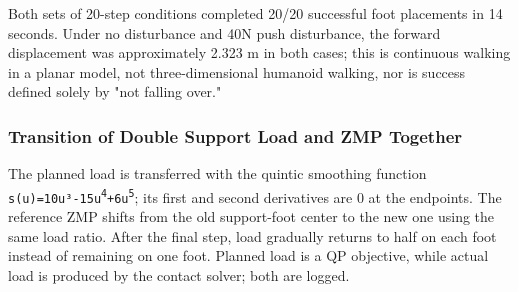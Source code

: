 Both sets of 20-step conditions completed 20/20 successful foot placements in 14 seconds. Under no disturbance and 40N push disturbance, the forward displacement was approximately 2.323 m in both cases; this is continuous walking in a planar model, not three-dimensional humanoid walking, nor is success defined solely by "not falling over."


\subsubsection{Transition of Double Support Load and ZMP Together}\label{s23-detail-3}

The planned load is transferred with the quintic smoothing function \texttt{\footnotesize s(u)=10u³-15u\textsuperscript{4}+6u\textsuperscript{5}}; its first and second derivatives are 0 at the endpoints. The reference ZMP shifts from the old support-foot center to the new one using the same load ratio. After the final step, load gradually returns to half on each foot instead of remaining on one foot. Planned load is a QP objective, while actual load is produced by the contact solver; both are logged.

